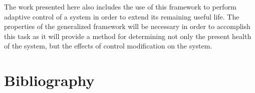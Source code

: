 \documentclass[12pt]{article}
\begin{document}
The work presented here also includes the use of this framework to perform
adaptive control of a system in order to extend its remaining useful life.  The
properties of the generalized framework will be necessary in order to
accomplish this task as it will provide a method for determining not only the
present health of the system, but the effects of control modification on the
system.  


\section{Bibliography}


\end{document}
